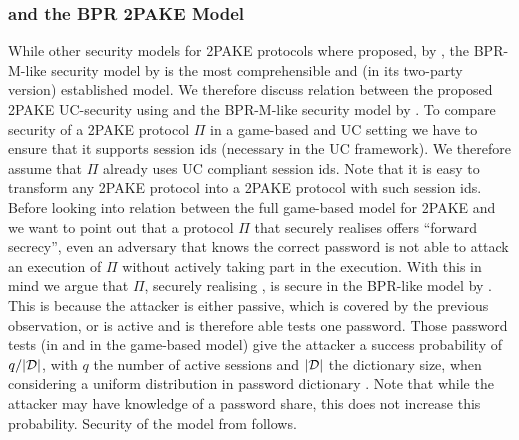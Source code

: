 \subsubsection{\FTWOPAKE and the BPR 2PAKE Model}
While other security models for \ac{2PAKE} protocols where proposed, \eg by \citet{SzydloK05}, the \ac{BPR-M}-like security model by \citet{Katz2012a} is the most comprehensible and (in its two-party version) established model.
We therefore discuss relation between the proposed \ac{2PAKE} \ac{UC}-security using \FTWOPAKE and the \ac{BPR-M}-like security model by \citet{Katz2012a}.
To compare security of a \ac{2PAKE} protocol $\Pi$ in a game-based and \ac{UC} setting we have to ensure that it supports session ids (necessary in the \ac{UC} framework).
We therefore assume that $\Pi$ already uses \ac{UC} compliant session ids.
Note that it is easy to transform any \ac{2PAKE} protocol into a \ac{2PAKE} protocol with such session ids.
Before looking into relation between the full game-based model for \ac{2PAKE} and \FTWOPAKE we want to point out that a protocol $\Pi$ that securely realises \FTWOPAKE offers ``forward secrecy'', \ie even an adversary that knows the correct password is not able to attack an execution of $\Pi$ without actively taking part in the execution.
With this in mind we argue that $\Pi$, securely realising \FTWOPAKE, is secure in the BPR-like model by \citet{Katz2012a}.
This is because the attacker is either passive, which is covered by the previous observation, or is active and is therefore able tests one password.
Those password tests (\TestPwd in \FTWOPAKE and \Send in the game-based model) give the attacker a success probability of $q/|\mathcal{D}|$, with $q$ the number of active sessions and $|\mathcal{D}|$ the dictionary size, when considering a uniform distribution in password dictionary \cD.
Note that while the attacker may have knowledge of a password share, this does not increase this probability.
Security of the model from \citet{Katz2012a} follows.

